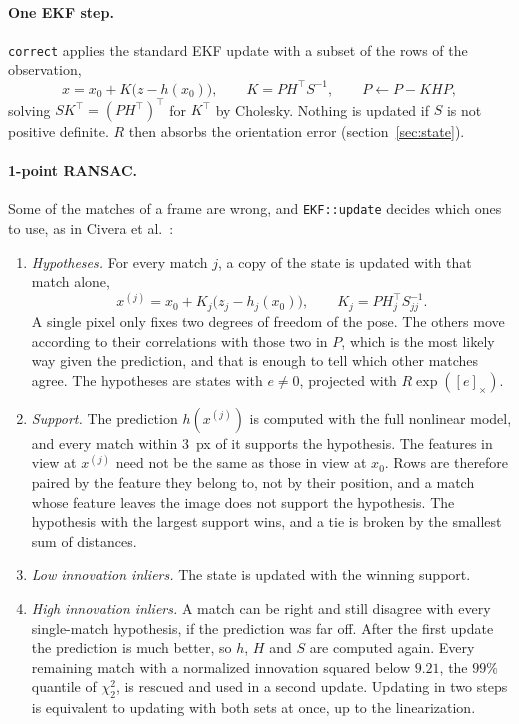 \documentclass[11pt]{article}
\begin{document}
\paragraph{One EKF step.}
\texttt{correct} applies the standard EKF update with a subset of the rows of the observation,
\begin{equation}
  x = x_0 + K \big(z - h(x_0)\big),
  \qquad
  K = P H^\top S^{-1},
  \qquad
  P \leftarrow P - K H P,
\end{equation}
solving $S K^\top = (P H^\top)^\top$ for $K^\top$ by Cholesky. Nothing is updated if $S$ is not
positive definite. $R$ then absorbs the orientation error (section~\ref{sec:state}).

\paragraph{1-point RANSAC.}
Some of the matches of a frame are wrong, and \texttt{EKF::update} decides which ones to use,
as in Civera et al.~\cite{civera2010}:
\begin{enumerate}
  \item \emph{Hypotheses.} For every match $j$, a copy of the state is updated with that match
        alone,
        \begin{equation}
          x^{(j)} = x_0 + K_j \big( z_j - h_j(x_0) \big),
          \qquad
          K_j = P H_j^\top S_{jj}^{-1}.
        \end{equation}
        A single pixel only fixes two degrees of freedom of the pose. The others move according to
        their correlations with those two in $P$, which is the most likely way given the
        prediction, and that is enough to tell which other matches agree. The hypotheses are states
        with $e \neq 0$, projected with $R \exp([e]_\times)$.
  \item \emph{Support.} The prediction $h(x^{(j)})$ is computed with the full nonlinear model, and
        every match within $3$~px of it supports the hypothesis. The features in view at $x^{(j)}$
        need not be the same as those in view at $x_0$. Rows are therefore paired by the feature
        they belong to, not by their position, and a match whose feature leaves the image does not
        support the hypothesis. The hypothesis with the largest support wins, and a tie is broken by
        the smallest sum of distances.
  \item \emph{Low innovation inliers.} The state is updated with the winning support.
  \item \emph{High innovation inliers.} A match can be right and still disagree with every
        single-match hypothesis, if the prediction was far off. After the first update the
        prediction is much better, so $h$, $H$ and $S$ are computed again. Every remaining match
        with a normalized innovation squared below $9.21$, the $99\%$ quantile of $\chi^2_2$, is
        rescued and used in a second update. Updating in two steps is equivalent to updating with
        both sets at once, up to the linearization.
\end{enumerate}
\end{document}
